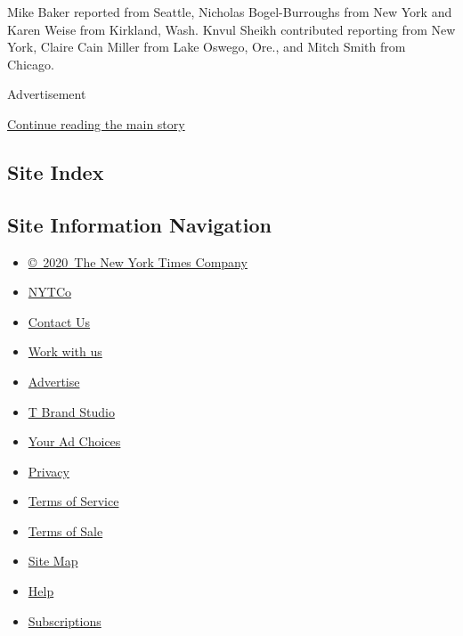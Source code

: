Mike Baker reported from Seattle, Nicholas Bogel-Burroughs from New York
and Karen Weise from Kirkland, Wash. Knvul Sheikh contributed reporting
from New York, Claire Cain Miller from Lake Oswego, Ore., and Mitch
Smith from Chicago.

Advertisement

\protect\hyperlink{after-bottom}{Continue reading the main story}

\hypertarget{site-index}{%
\subsection{Site Index}\label{site-index}}

\hypertarget{site-information-navigation}{%
\subsection{Site Information
Navigation}\label{site-information-navigation}}

\begin{itemize}
\tightlist
\item
  \href{https://help.nytimes3xbfgragh.onion/hc/en-us/articles/115014792127-Copyright-notice}{©~2020~The
  New York Times Company}
\end{itemize}

\begin{itemize}
\tightlist
\item
  \href{https://www.nytco.com/}{NYTCo}
\item
  \href{https://help.nytimes3xbfgragh.onion/hc/en-us/articles/115015385887-Contact-Us}{Contact
  Us}
\item
  \href{https://www.nytco.com/careers/}{Work with us}
\item
  \href{https://nytmediakit.com/}{Advertise}
\item
  \href{http://www.tbrandstudio.com/}{T Brand Studio}
\item
  \href{https://www.nytimes3xbfgragh.onion/privacy/cookie-policy\#how-do-i-manage-trackers}{Your
  Ad Choices}
\item
  \href{https://www.nytimes3xbfgragh.onion/privacy}{Privacy}
\item
  \href{https://help.nytimes3xbfgragh.onion/hc/en-us/articles/115014893428-Terms-of-service}{Terms
  of Service}
\item
  \href{https://help.nytimes3xbfgragh.onion/hc/en-us/articles/115014893968-Terms-of-sale}{Terms
  of Sale}
\item
  \href{https://spiderbites.nytimes3xbfgragh.onion}{Site Map}
\item
  \href{https://help.nytimes3xbfgragh.onion/hc/en-us}{Help}
\item
  \href{https://www.nytimes3xbfgragh.onion/subscription?campaignId=37WXW}{Subscriptions}
\end{itemize}
